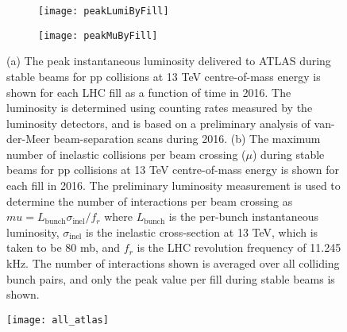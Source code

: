 \begin{figure}[t!]
\centering
\begin{subfigure}[t]{0.48\textwidth}
\texttt{[image: peakLumiByFill]}
\label{fig:exp.peakLumiByFill}
\end{subfigure}
\begin{subfigure}[t]{0.48\textwidth}
\texttt{[image: peakMuByFill]}
\label{fig:exp.peakMuByFill}
\end{subfigure}
\vspace{-0.25cm}
\caption{(a) The peak instantaneous luminosity delivered to ATLAS during stable beams for pp collisions at 13 TeV centre-of-mass energy is shown for each LHC fill as a function of time in 2016. The luminosity is determined using counting rates measured by the luminosity detectors, and is based on a preliminary analysis of van-der-Meer beam-separation scans during 2016.
(b) The maximum number of inelastic collisions per beam crossing ($\mu$) during stable beams for pp collisions at 13 TeV centre-of-mass energy is shown for each fill in 2016. The preliminary luminosity measurement is used to determine the number of interactions per beam crossing as $mu = L_\text{bunch}  \sigma_\text{inel} / f_r$ where $L_\text{bunch}$ is the per-bunch instantaneous luminosity, $ \sigma_\text{inel} $ is the inelastic cross-section at 13 TeV, which is taken to be 80 mb, and $ f_r$ is the LHC revolution frequency of 11.245 kHz. The number of interactions shown is averaged over all colliding bunch pairs, and only the peak value per fill during stable beams is shown.
 }
\label{fig:}
\end{figure} 




\begin{figure}[t!]
\centering
\texttt{[image: all\_atlas]}
\caption{ }
\label{fig:exp.sumLumiByDay}
\end{figure} 





